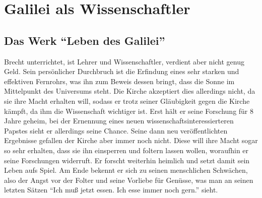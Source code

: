 \documentclass[12pt]{scrreprt}
\begin{document}
\chapter{Galilei als Wissenschaftler}
	\label{chap:galilei als wissenschaftler}
\section{Das Werk \enquote{Leben des Galilei}}
	\label{sec:das werk leben des galilei}
Brecht unterrichtet, ist Lehrer und Wissenschaftler, verdient aber nicht genug Geld.
Sein persönlicher Durchbruch ist die Erfindung eines sehr starken und effektiven Fernrohrs, was ihn zum Beweis dessen bringt, dass die Sonne im Mittelpunkt des Universums steht.
Die Kirche akzeptiert dies allerdings nicht, da sie ihre Macht erhalten will, sodass er trotz seiner Gläubigkeit gegen die Kirche kämpft, da ihm die Wissenschaft wichtiger ist.
Erst hält er seine Forschung für 8 Jahre geheim, bei der Ernennung eines neuen wissenschaftsinteressierteren Papstes sieht er allerdings seine Chance.
Seine dann neu veröffentlichten Ergebnisse gefallen der Kirche aber immer noch nicht.
Diese will ihre Macht sogar so sehr erhalten, dass sie ihn einsperren und foltern lassen wollen, woraufhin er seine Forschungen widerruft.
Er forscht weiterhin heimlich und setzt damit sein Leben aufs Spiel.
Am Ende bekennt er sich zu seinen menschlichen Schwächen, also der Angst vor der Folter und seine Vorliebe für Genüsse, was man an seinen letzten Sätzen \enquote{Ich muß jetzt essen. Ich esse immer noch gern.} sieht.
\autocite{wiki:Galilei_Studyflix}
\autocite{wiki:Leben_des_Galilei}
\printbibliography
\end{document}
